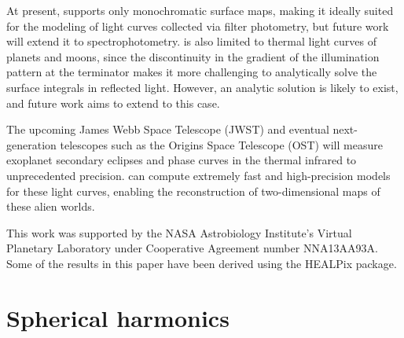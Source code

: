 \documentclass[modern]{aastex61}
\begin{document}
At present, \starry supports only
monochromatic surface maps, making it ideally suited for the modeling of
light curves collected via filter photometry, but future work will extend
it to spectrophotometry. \starry is also limited to thermal light curves of
planets and moons, since the discontinuity in the gradient of the
illumination pattern at the terminator makes it more challenging to analytically
solve the surface integrals in reflected light. However, an analytic solution
is likely to exist, and future work aims to extend \starry to this case.

The upcoming James Webb Space Telescope (JWST) and eventual
next-generation telescopes such as the Origins Space Telescope (OST) will
measure exoplanet secondary eclipses and
phase curves in the thermal infrared to unprecedented precision. \starry
can compute extremely fast and high-precision models for these
light curves, enabling the reconstruction of two-dimensional maps of these
alien worlds.


\acknowledgments
This work was supported by the NASA Astrobiology
Institute's Virtual Planetary Laboratory under Cooperative
Agreement number NNA13AA93A.
%
Some of the results in this paper have been derived using the HEALPix
\citep{Gorski2005} package.



%

%


\pagebreak
\appendix


\section{Spherical harmonics}
\label{app:spharm}
\end{document}
